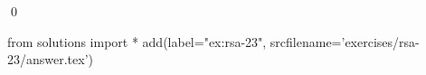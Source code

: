 
\begin{ex} 
  \label{ex:rsa-23}
  
  \qed
\end{ex} 
\begin{python0}
from solutions import *
add(label="ex:rsa-23",
    srcfilename='exercises/rsa-23/answer.tex') 
\end{python0}
